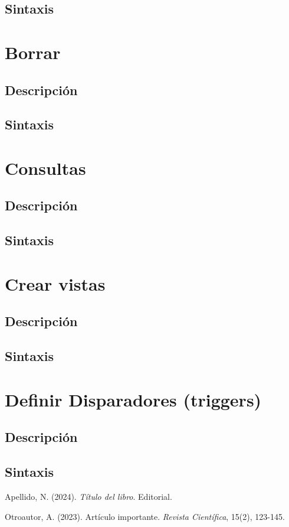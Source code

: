\documentclass[12pt, a4paper]{article}
\begin{document}
\subsection{Sintaxis}

\section{Borrar}
\subsection{Descripción}
\subsection{Sintaxis}

\section{Consultas}
\subsection{Descripción}
\subsection{Sintaxis}

\section{Crear vistas}
\subsection{Descripción}
\subsection{Sintaxis}

\section{Definir Disparadores (triggers)}
\subsection{Descripción}
\subsection{Sintaxis}


\begin{thebibliography}{9}
Apellido, N. (2024). \emph{Título del libro}. Editorial.

Otroautor, A. (2023). Artículo importante. \emph{Revista Científica}, 15(2),
123-145.
\end{thebibliography}
\end{document}
